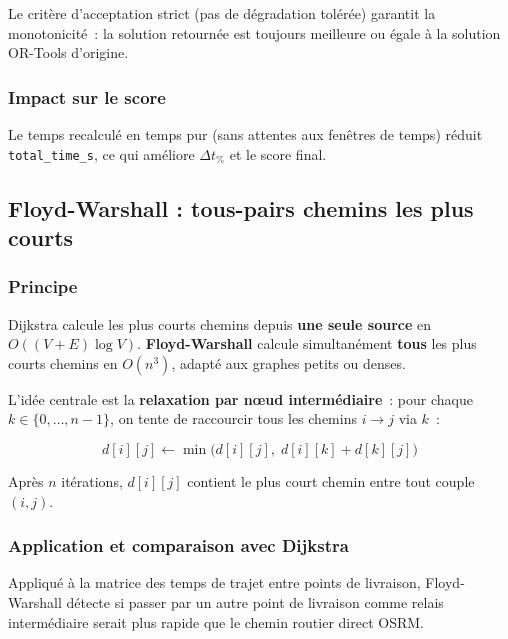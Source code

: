 \documentclass[a4paper, 12pt, twoside]{article}
\begin{document}
Le crit\`{e}re d'acceptation strict (pas de d\'{e}gradation tol\'{e}r\'{e}e) garantit la monotonicité~: la solution retournée est toujours meilleure ou \'{e}gale à la solution OR-Tools d'origine.

\subsubsection{Impact sur le score}

Le temps recalcul\'{e} en temps pur (sans attentes aux fen\^{e}tres de temps) r\'{e}duit \texttt{total\_time\_s}, ce qui am\'{e}liore $\Delta t_{\%}$ et le score final.

\subsection{Floyd-Warshall : tous-pairs chemins les plus courts}

\subsubsection{Principe}

Dijkstra calcule les plus courts chemins depuis \textbf{une seule source} en $O((V+E)\log V)$. \textbf{Floyd-Warshall} calcule simultanément \textbf{tous} les plus courts chemins en $O(n^3)$, adapté aux graphes petits ou denses.

L'id\'{e}e centrale est la \textbf{relaxation par nœud interm\'{e}diaire}~: pour chaque $k \in \{0, \ldots, n-1\}$, on tente de raccourcir tous les chemins $i \to j$ via $k$~:

\[
d[i][j] \leftarrow \min\bigl(d[i][j],\; d[i][k] + d[k][j]\bigr)
\]

Apr\`{e}s $n$ it\'{e}rations, $d[i][j]$ contient le plus court chemin entre tout couple $(i, j)$.

\subsubsection{Application et comparaison avec Dijkstra}

Appliqu\'{e} \`{a} la matrice des temps de trajet entre points de livraison, Floyd-Warshall d\'{e}tecte si passer par un autre point de livraison comme relais intermédiaire serait plus rapide que le chemin routier direct OSRM.
\end{document}
